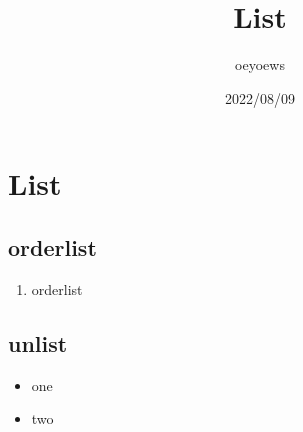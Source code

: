 \documentclass{article}
\title{List}
\author{oeyoews}
\date{2022/08/09}
\begin{document}
\maketitle

\section{List}%
\label{List}

\subsection{orderlist}%
\label{sub:orderlist}

\begin{enumerate}
	\item orderlist
\end{enumerate}

\subsection{unlist}%
\label{sub:unlist}

\begin{itemize}
	\item one
	\item two
\end{itemize}
\end{document}
